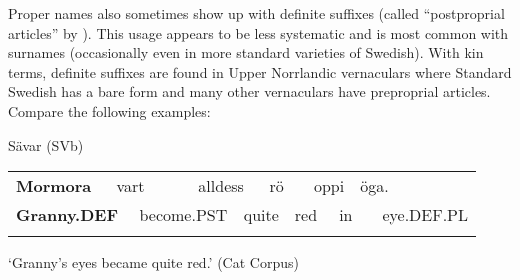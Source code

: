 \begin{styleBodytextC}
Proper names also sometimes show up with definite suffixes (called “postproprial articles” by \citet[23]{Delsing2003a}). This usage appears to be less systematic and is most common with surnames (occasionally even in more standard varieties of Swedish). With kin terms, definite suffixes are found in Upper Norrlandic vernaculars where Standard Swedish has a bare form and many other vernaculars have preproprial articles. Compare the following examples:

\end{styleBodytextC}

\begin{listWWNumileveli}
\item 

\end{listWWNumileveli}

\begin{listWWNumliileveli}
\item 

\begin{styleExLtrTbl}
Sävar (SVb)

\end{styleExLtrTbl}

\end{listWWNumliileveli}

\begin{tabular}{llllllllllll}
\lsptoprule
{\bfseries Mormora} & \multicolumn{2}{l}{vart

} & \multicolumn{2}{l}{alldess

} & \multicolumn{2}{l}{rö

} & \multicolumn{2}{l}{oppi

} & \multicolumn{2}{l}{öga.

} & \\
\multicolumn{2}{l}{{\bfseries Granny.DEF}

} & \multicolumn{2}{l}{become.PST

} & \multicolumn{2}{l}{quite

} & \multicolumn{2}{l}{red

} & \multicolumn{2}{l}{in

} & \multicolumn{2}{l}{eye.DEF.PL

}\\
\lspbottomrule
\end{tabular}

\begin{styleTranslation}
‘Granny’s eyes became quite red.’ (Cat Corpus)

\end{styleTranslation}

